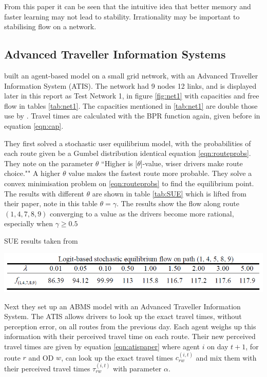 \documentclass[12pt, a4paper, onecolumn]{article}
\begin{document}
From this paper it can be seen that the intuitive idea that better memory and faster learning may not lead to stability. Irrationality may be important to stabilising flow on a network. 

\subsection{Advanced Traveller Information Systems}
\cite{Liu2007} built an agent-based model on a small grid network, with an Advanced Traveller Information System (ATIS). The network had 9 nodes 12 links, and is displayed later in this report as Test Network 1, in figure \ref{fig:net1} with capacities and free flow in tables \ref{tab:net1}. The capacities mentioned in \ref{tab:net1} are double those use by \citeauthor{Liu2007}. Travel times are calculated with the BPR function again, given before in equation \ref{eqn:cap}.

They first solved a stochastic user equilibrium model, with the probabilities of each route given be a Gumbel distribution identical equation \ref{eqn:routeprobs}. They note on the parameter $\theta$ ``Higher is [$\theta$]-value, wiser drivers make route choice."" A higher $\theta$ value makes the fastest route more probable. They solve a convex minimisation problem on \ref{eqn:routeprobs} to find the equilibrium point. The results with different $\theta$ are shown in table \ref{tab:SUE} which is lifted from their paper, note in this table $\theta = \gamma$. The results show the flow along route $(1,4,7,8,9)$ converging to a value as the drivers become more rational, especially when $\gamma \geq 0.5$ 

\begin{table}[h!]
	\centering
	\caption{SUE results taken from \cite{Liu2007}}
	\includegraphics[scale=.75]{atis_tableSUE.png}
	\label{tab:SUE}
	\end{table}

Next they set up an ABMS model with an Advanced Traveller Information System. The ATIS allows drivers to look up the exact travel times, without perception error, on all routes from the previous day. Each agent weighs up this information with their perceived travel time on each route. Their new perceived travel times are given by equation \ref{eqn:atispaper} where agent $i$ on day $t+1$, for route $r$ and OD $w$, can look up the exact travel times $c_{r w}^{(i, t)}$ and mix them with their perceived travel times $\tau_{r w}^{(i, t)}$ with parameter $\alpha$.
\end{document}
